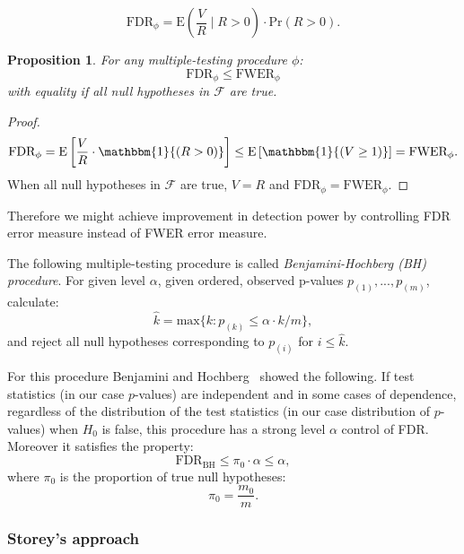 \documentclass[10pt]{article}
\newtheorem{proposition}[theorem]{Proposition}
\begin{document}
\begin{equation}
\text{FDR}_{\phi} = \text{E}\left(\frac{V}{R} \mid R > 0 \right) \cdot \text{Pr}(R > 0).
\end{equation}

\begin{proposition}
	For any multiple-testing procedure $\phi$: 
	\begin{equation}
		\text{FDR}_{\phi} \leq \text{FWER}_{\phi}
	\end{equation}
	with equality if all null hypotheses in $\mathcal{F}$ are true.
\end{proposition}
\begin{proof}
	\begin{equation}
	\text{FDR}_{\phi} = \text{E}\left[ \frac{V}{R} \cdot \mathbbm{1}{(R > 0)} \right] 
	\leq \text{E}\left[ \mathbbm{1}{(V \geq 1)} \right] = \text{FWER}_{\phi}.
	\end{equation}
	When all null hypotheses in $\mathcal{F}$ are true, $V = R$ and $\text{FDR}_{\phi} = \text{FWER}_{\phi}.$
\end{proof}
Therefore we might achieve improvement in detection power by controlling FDR error measure instead of FWER error measure.

The following multiple-testing procedure is called {\it Benjamini-Hochberg (BH) procedure}. For given level $\alpha$, given ordered, observed p-values $p_{(1)}, ..., p_{(m)}$, calculate:
\begin{equation}
	\widehat{k} = \text{max} \lbrace k : p_{(k)} \leq \alpha \cdot k/m \rbrace,
\end{equation}
and reject all null hypotheses corresponding to $p_{(i)}$ for $i \leq \widehat{k}$. 

For this procedure Benjamini and Hochberg~\cite{BH} showed the following. If test statistics (in our case $p$-values) are independent and in some cases of dependence, regardless of the distribution of the test statistics (in our case distribution of $p$-values) when $H_{0}$ is false, this procedure has a strong level $\alpha$ control of FDR. Moreover it satisfies the property:
\begin{equation}
\text{FDR}_{\text{BH}} \leq \pi_{0} \cdot \alpha \leq \alpha,
\end{equation}
where $\pi_{0}$ is the proportion of true null hypotheses:
\begin{equation}
\pi_{0} = \frac{m_{0}}{m}.
\end{equation}


\subsubsection{Storey's approach}
\end{document}
